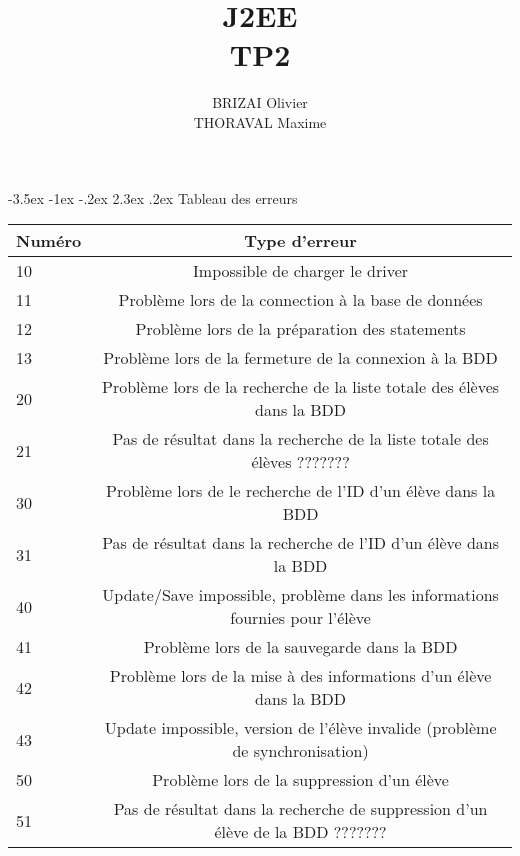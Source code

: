\documentclass[a4paper,12pt]{article}
\makeatletter
\renewcommand\section{\@startsection {section}{1}{\z@}%
                           {-3.5ex \@plus -1ex \@minus -.2ex}%
                           {2.3ex \@plus.2ex}%
                           {\normalfont\Large\bfseries}}
\makeatother
\begin{document}
\newpage
\title{J2EE\\TP2}
\date{}
\author{BRIZAI Olivier\\THORAVAL Maxime}
\maketitle

\newpage

\section{Tableau des erreurs}

\begin{tabular}{|l|c|}
  \hline
  Numéro & Type d'erreur \\
  \hline
	10 & Impossible de charger le driver \\
	11 & Problème lors de la connection à la base de données \\
	12 & Problème lors de la préparation des statements \\
 	13 & Problème lors de la fermeture de la connexion à la BDD \\
	20 & Problème lors de la recherche de la liste totale des élèves dans la BDD \\
	21 & Pas de résultat dans la recherche de la liste totale des élèves ??????? \\
	30 & Problème lors de le recherche de l'ID d'un élève dans la BDD\\
	31 & Pas de résultat dans la recherche de l'ID d'un élève dans la BDD \\
	40 & Update/Save impossible, problème dans les informations fournies pour l'élève \\
	41 & Problème lors de la sauvegarde dans la BDD \\
	42 & Problème lors de la mise à des informations d'un élève dans la BDD\\
	43 & Update impossible, version de l'élève invalide (problème de synchronisation)\\
	50 & Problème lors de la suppression d'un élève \\
	51 & Pas de résultat dans la recherche de suppression d'un élève de la BDD ??????? \\
  \hline
\end{tabular}
\end{document}

